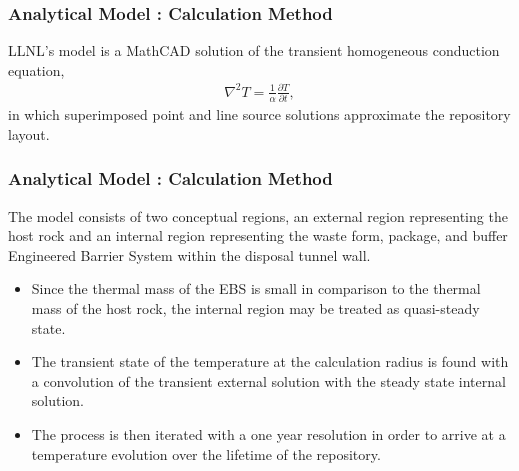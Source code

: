 \begin{frame}
  \frametitle{Analytical Model : Calculation Method}
    LLNL's model is a MathCAD solution of the transient homogeneous 
    conduction equation,
    \begin{align}
      \nabla^2T  = \frac{1}{\alpha}\frac{\partial T}{\partial t},
      \label{condGl}
    \end{align}
    in which superimposed point and line source solutions approximate the repository 
    layout.
\end{frame}

\begin{frame}[ctb!]
\frametitle{Analytical Model : Calculation Method}
The model consists of two conceptual regions, an external region representing 
the host rock and an internal region representing the waste form, package, and 
buffer Engineered Barrier System within the disposal tunnel wall. 
\begin{itemize}
  \item Since the thermal mass of the EBS is small in comparison to the thermal mass of the host rock, the internal region may be treated as quasi-steady state. 
  \item The transient state of the temperature at the calculation radius is found with a convolution of the transient external solution with the steady state internal solution.  
  \item The process is then iterated with a one year resolution in order to arrive at a temperature evolution over the lifetime of the repository. 
\end{itemize}
\end{frame}


